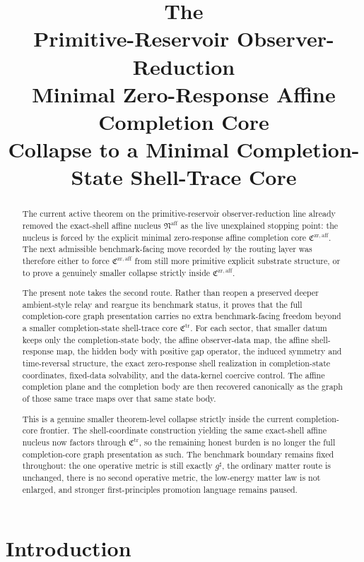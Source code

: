 \documentclass[11pt]{article}
\title{\textbf{The \TheoryName{}}\\[0.4em]
\large Primitive-Reservoir Observer-Reduction\\
\large Minimal Zero-Response Affine Completion Core\\
\large Collapse to a Minimal Completion-State Shell-Trace Core}
\author{}
\date{}
\newcommand{\CompletedMetric}{g^{\sharp}}
\newcommand{\CompletionCore}{\mathfrak C^{\mathrm{zr,aff}}}
\newcommand{\TraceCore}{\mathfrak C^{\mathrm{tr}}}
\newcommand{\AffineNucleus}{\mathfrak N^{\mathrm{aff}}}
\begin{document}
\maketitle

\begin{abstract}
The current active theorem on the primitive-reservoir observer-reduction line already removed the exact-shell affine nucleus \(\AffineNucleus\) as the live unexplained stopping point: the nucleus is forced by the explicit minimal zero-response affine completion core \(\CompletionCore\). The next admissible benchmark-facing move recorded by the routing layer was therefore either to force \(\CompletionCore\) from still more primitive explicit substrate structure, or to prove a genuinely smaller collapse strictly inside \(\CompletionCore\).

The present note takes the second route. Rather than reopen a preserved deeper ambient-style relay and reargue its benchmark status, it proves that the full completion-core graph presentation carries no extra benchmark-facing freedom beyond a smaller completion-state shell-trace core \(\TraceCore\). For each sector, that smaller datum keeps only the completion-state body, the affine observer-data map, the affine shell-response map, the hidden body with positive gap operator, the induced symmetry and time-reversal structure, the exact zero-response shell realization in completion-state coordinates, fixed-data solvability, and the data-kernel coercive control. The affine completion plane and the completion body are then recovered canonically as the graph of those same trace maps over that same state body.

This is a genuine smaller theorem-level collapse strictly inside the current completion-core frontier. The shell-coordinate construction yielding the same exact-shell affine nucleus now factors through \(\TraceCore\), so the remaining honest burden is no longer the full completion-core graph presentation as such. The benchmark boundary remains fixed throughout: the one operative metric is still exactly \(\CompletedMetric\), the ordinary matter route is unchanged, there is no second operative metric, the low-energy matter law is not enlarged, and stronger first-principles promotion language remains paused.
\end{abstract}

\section{Introduction}
\end{document}
